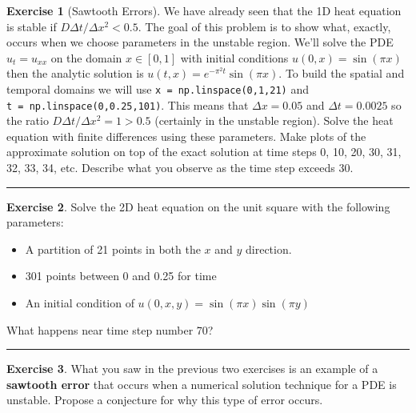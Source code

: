 \documentclass[
]{book}
\providecommand{\tightlist}{%
  \setlength{\itemsep}{0pt}\setlength{\parskip}{0pt}}
\theoremstyle{definition}
\theoremstyle{definition}
\theoremstyle{definition}
\newtheorem{exercise}{Exercise}[chapter]
\theoremstyle{remark}
\begin{document}
\begin{exercise}[Sawtooth Errors]
\protect\hypertarget{exr:unnamed-chunk-566}{}{\label{exr:unnamed-chunk-566} {} }We have already seen that the 1D heat equation is stable if \(D \Delta t / \Delta x^2 < 0.5\). The goal of this problem is to show what, exactly, occurs when we choose parameters in the unstable region. We'll solve the PDE \(u_t = u_{xx}\) on the domain \(x \in [0,1]\) with initial conditions \(u(0,x) = \sin(\pi x)\) then the analytic solution is \(u(t,x) = e^{-\pi^2 t}\sin(\pi x)\). To build the spatial and temporal domains we will use \texttt{x\ =\ np.linspace(0,1,21)} and \texttt{t\ =\ np.linspace(0,0.25,101)}. This means that \(\Delta x = 0.05\) and \(\Delta t = 0.0025\) so the ratio \(D \Delta t / \Delta x^2 = 1 > 0.5\) (certainly in the unstable region). Solve the heat equation with finite differences using these parameters. Make plots of the approximate solution on top of the exact solution at time steps 0, 10, 20, 30, 31, 32, 33, 34, etc. Describe what you observe as the time step exceeds 30.
\end{exercise}

\begin{center}\rule{0.5\linewidth}{0.5pt}\end{center}

\begin{exercise}
\protect\hypertarget{exr:unnamed-chunk-567}{}{\label{exr:unnamed-chunk-567} }Solve the 2D heat equation on the unit square with the following parameters:

\begin{itemize}
\tightlist
\item
  A partition of 21 points in both the \(x\) and \(y\) direction.
\item
  301 points between 0 and 0.25 for time
\item
  An initial condition of \(u(0,x,y) = \sin(\pi x) \sin(\pi y)\)
\end{itemize}

What happens near time step number 70?
\end{exercise}

\begin{center}\rule{0.5\linewidth}{0.5pt}\end{center}

\begin{exercise}
\protect\hypertarget{exr:unnamed-chunk-568}{}{\label{exr:unnamed-chunk-568} }What you saw in the previous two exercises is an example of a \textbf{sawtooth error} that occurs when a numerical solution technique for a PDE is unstable. Propose a conjecture for why this type of error occurs.
\end{exercise}
\end{document}
